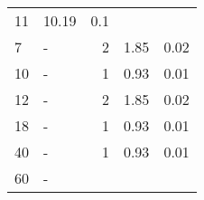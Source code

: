\begin{longtable}{lXrrr}
       \num{11} &
       \num[round-mode=places,round-precision=2]{10.19} &
         \num[round-mode=places,round-precision=2]{0.1} \\

     7 &
     \multicolumn{1}{X}{ -  } &


       \num{2} &
       \num[round-mode=places,round-precision=2]{1.85} &
         \num[round-mode=places,round-precision=2]{0.02} \\

     10 &
     \multicolumn{1}{X}{ -  } &


       \num{1} &
       \num[round-mode=places,round-precision=2]{0.93} &
         \num[round-mode=places,round-precision=2]{0.01} \\

     12 &
     \multicolumn{1}{X}{ -  } &


       \num{2} &
       \num[round-mode=places,round-precision=2]{1.85} &
         \num[round-mode=places,round-precision=2]{0.02} \\

     18 &
     \multicolumn{1}{X}{ -  } &


       \num{1} &
       \num[round-mode=places,round-precision=2]{0.93} &
         \num[round-mode=places,round-precision=2]{0.01} \\

     40 &
     \multicolumn{1}{X}{ -  } &


       \num{1} &
       \num[round-mode=places,round-precision=2]{0.93} &
         \num[round-mode=places,round-precision=2]{0.01} \\

     60 &
     \multicolumn{1}{X}{ -  } &



\end{longtable}
